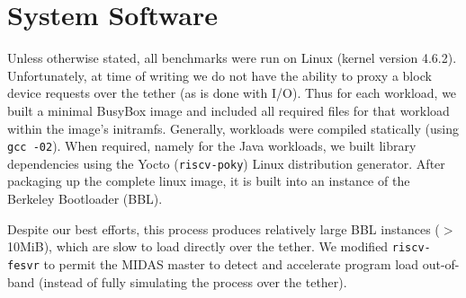 %

\section{System Software}

Unless otherwise stated, all benchmarks were run on Linux (kernel version
4.6.2). Unfortunately, at time of writing we do not have the ability to proxy a
block device requests over the tether (as is done with I/O). Thus for each
workload, we built a minimal BusyBox image and included all required files for
that workload within the image's initramfs.  Generally, workloads were compiled
statically (using \texttt{gcc -02}). When required, namely for the Java workloads, we
built library dependencies using the Yocto (\texttt{riscv-poky}) Linux
distribution generator. After packaging up the complete linux image, it is
built into an instance of the Berkeley Bootloader (BBL).

Despite our best efforts, this process produces relatively large BBL instances
($>$ 10MiB), which are slow to load directly over the tether.  We modified
\texttt{riscv-fesvr} to permit the MIDAS master to detect and accelerate program load
out-of-band (instead of fully simulating the process over the tether).

